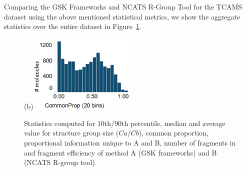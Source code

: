\documentclass[journal=jacsat,manuscript=article]{achemso}
\newcommand*\fref[1]{Figure~\ref{fig:#1}}
\begin{document}
Comparing the GSK Frameworks and NCATS R-Group Tool for the TCAMS dataset using the above mentioned statistical metrics, we show the aggregate statistics over the entire dataset in \fref{statcomparetable}.  

\begin{figure}
  \begin{minipage}[c]{\linewidth}
\vspace{0pt}
\centering
{}
(b)\includegraphics[width=2in]{fig/CP_TCAMS_GSKFW_RGT.png}
  \end{minipage}
  \caption{Statistics computed for 10th/90th percentile, median and average value for structure group size ($Ca$/$Cb$), common proportion, proportional information unique to A and B, number of fragments in and fragment efficiency of method A (GSK frameworks) and B (NCATS R-group tool).}
\label{fig:statcomparetable}
\end{figure}
\end{document}
